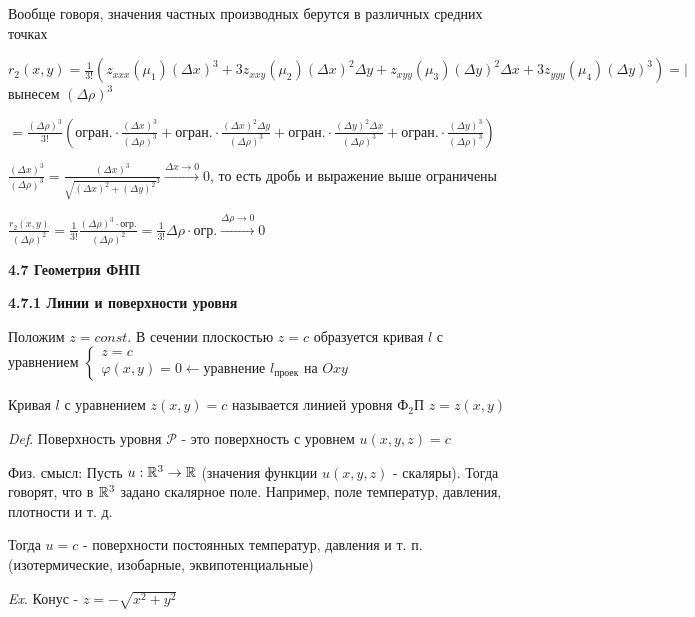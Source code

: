 \documentclass[12pt]{article}
\begin{document}
    Вообще говоря, значения частных производных берутся в различных средних точках

    $\displaystyle r_2(x, y) = \frac{1}{3!} (z_{xxx}(\mu_1)(\Delta x)^3 + 3 z_{xxy}(\mu_2)(\Delta x)^2 \Delta y + z_{xyy}(\mu_3)(\Delta y)^2 \Delta x + 3 z_{yyy}(\mu_4)(\Delta y)^3) = \Big|$ вынесем $(\Delta \rho)^3$

    $\displaystyle = \frac{(\Delta \rho)^3}{3!} (\text{огран.} \cdot \frac{(\Delta x)^3}{(\Delta \rho)^3} + \text{огран.} \cdot \frac{(\Delta x)^2 \Delta y}{(\Delta \rho)^3} + \text{огран.} \cdot \frac{(\Delta y)^2 \Delta x}{(\Delta \rho)^3} + \text{огран.} \cdot \frac{(\Delta y)^3}{(\Delta \rho)^3})$

    $\displaystyle \frac{(\Delta x)^3}{(\Delta \rho)^3} = \frac{(\Delta x)^3}{\sqrt{(\Delta x)^2 + (\Delta y)^2}^3} \stackrel{\Delta x \to 0}{\rightarrow} 0$, то есть дробь и выражение выше ограничены

    $\displaystyle \frac{r_2(x, y)}{(\Delta \rho)^2} = \frac{1}{3!} \frac{(\Delta \rho)^3 \cdot \text{огр.}}{(\Delta \rho)^2} = \frac{1}{3!} \Delta \rho \cdot \text{огр.} \stackrel{\Delta \rho \to 0}{\rightarrow} 0$

    \clearpage

    \textbf{4.7 Геометрия ФНП}

    \vspace{4mm}
    \textbf{4.7.1 Линии и поверхности уровня}

    Положим $z = const$. В сечении плоскостью $z = c$ образуется кривая $l$ с уравнением $\begin{cases}z = c \\ \varphi(x, y) = 0 \leftarrow \text{уравнение $l_\text{проек}$ на $Oxy$}\end{cases}$

    Кривая $l$ с уравнением $z(x, y) = c$ называется линией уровня Ф$_2$П $z = z(x, y)$

    \vspace{3mm}
\textit{Def}. Поверхность уровня $\mathcal{P}$ - это поверхность с уровнем $u(x, y, z) = c$

    Физ. смысл: Пусть $u : \mathbb{R}^3 \rightarrow \mathbb{R}$ (значения функции $u(x, y, z)$ - скаляры). Тогда говорят, что в $\mathbb{R}^3$ задано скалярное поле. Например, поле температур, давления, плотности и т. д.

    Тогда $u = c$ - поверхности постоянных температур, давления и т. п. (изотермические, изобарные, эквипотенциальные)

    \vspace{3mm}
\textit{Ex}. Конус - $z = -\sqrt{x^2 + y^2}$
\end{document}
